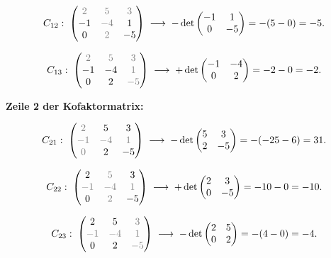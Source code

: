 \documentclass[a4paper,12pt]{article}
\begin{document}
\[
C_{12}: \;
\begin{pmatrix}
\color{gray}2 & \color{gray}5 & \color{gray}3 \\
-1 & \color{gray}{-4} & 1 \\
0 & \color{gray}2 & -5
\end{pmatrix}
\;\longrightarrow\;
-\det \begin{pmatrix} -1 & 1 \\ 0 & -5 \end{pmatrix} = -(5 - 0) = -5.
\]

\[
C_{13}: \;
\begin{pmatrix}
\color{gray}2 & \color{gray}5 & \color{gray}3 \\
-1 & -4 & \color{gray}1 \\
0 & 2 & \color{gray}{-5}
\end{pmatrix}
\;\longrightarrow\;
+\det \begin{pmatrix} -1 & -4 \\ 0 & 2 \end{pmatrix} = -2 - 0 = -2.
\]

\textbf{Zeile 2 der Kofaktormatrix:}

\[
C_{21}: \;
\begin{pmatrix}
\color{gray}2 & 5 & 3 \\
\color{gray}{-1} & \color{gray}{-4} & \color{gray}1 \\
\color{gray}0 & 2 & -5
\end{pmatrix}
\;\longrightarrow\;
-\det \begin{pmatrix} 5 & 3 \\ 2 & -5 \end{pmatrix} = -(-25 - 6) = 31.
\]

\[
C_{22}: \;
\begin{pmatrix}
2 & \color{gray}5 & 3 \\
\color{gray}{-1} & \color{gray}{-4} & \color{gray}1 \\
0 & \color{gray}2 & -5
\end{pmatrix}
\;\longrightarrow\;
+\det \begin{pmatrix} 2 & 3 \\ 0 & -5 \end{pmatrix} = -10 - 0 = -10.
\]

\[
C_{23}: \;
\begin{pmatrix}
2 & 5 & \color{gray}3 \\
\color{gray}{-1} & \color{gray}{-4} & \color{gray}1 \\
0 & 2 & \color{gray}{-5}
\end{pmatrix}
\;\longrightarrow\;
-\det \begin{pmatrix} 2 & 5 \\ 0 & 2 \end{pmatrix} = -(4 - 0) = -4.
\]
\end{document}

